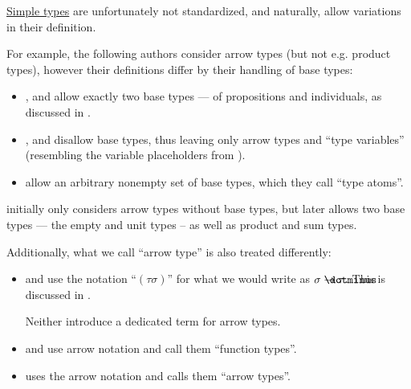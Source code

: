\begin{remark}\label{rem:simple_type_terminology_and_notation}
  \hyperref[def:simple_type]{Simple types} are unfortunately not standardized, and naturally, allow variations in their definition.

  For example, the following authors consider arrow types (but not e.g. product types), however their definitions differ by their handling of base types:
  \begin{itemize}
    \item {},  and  allow exactly two base types --- of propositions and individuals, as discussed in .

    \item {},  and  disallow base types, thus leaving only arrow types and \enquote{type variables} (resembling the variable placeholders from ).

    \item {} allow an arbitrary nonempty set of base types, which they call \enquote{type atoms}.
  \end{itemize}

   initially only considers arrow types without base types, but later allows two base types --- the empty and unit types -- as well as product and sum types.

  Additionally, what we call \enquote{arrow type} is also treated differently:
  \begin{itemize}
    \item {} and  use the notation \enquote{\( (\tau\sigma) \)} for what we would write as \( \sigma \synimplies \tau \). This is discussed in .

    Neither introduce a dedicated term for arrow types.

    \item {} and  use arrow notation and call them \enquote{function types}.

    \item {} uses the arrow notation and calls them \enquote{arrow types}.


\end{itemize}
\end{remark}
